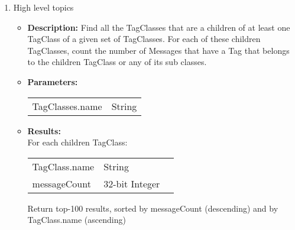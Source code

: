 {\begin{enumerate}
            \item High level topics 
            \begin{itemize}
                \item \textbf{Description:}
                  Find all the TagClasses that are a children of at least one TagClass of a given set of TagClasses. For each of these
                  children TagClasses, count the number of Messages that have a Tag that belongs to the children TagClass or any of its
                  sub classes.
                \item \textbf{Parameters:} \\
                    \begin{tabular}{ll}
                      TagClasses.name & {String} \\
                    \end{tabular}
                \item \textbf{Results:} \\
                  For each children TagClass:
                    \begin{tabular}{lll}
                      TagClass.name & String & \\
                      messageCount & 32-bit Integer & \\
                    \end{tabular}
                    Return top-100 results, sorted by messageCount (descending) and by TagClass.name (ascending)
                    \end{itemize}


\end{enumerate}}
